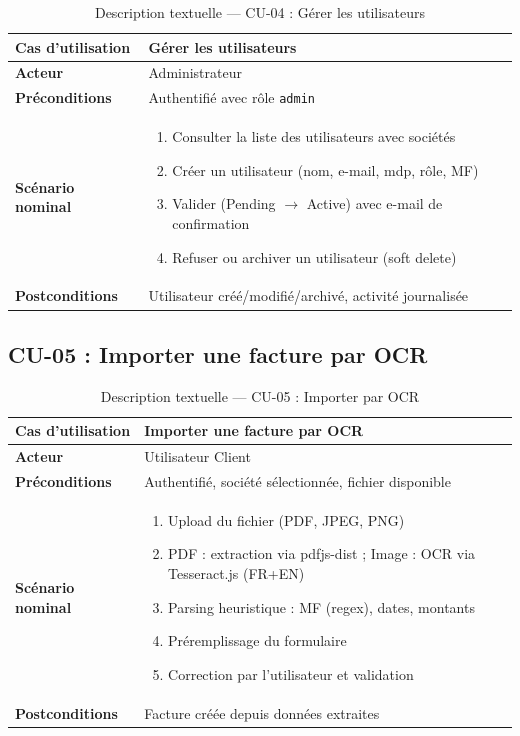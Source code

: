 \documentclass[a4paper,12pt]{report}
\begin{document}
\begin{table}[htbp]
\centering
\caption{Description textuelle — CU-04 : Gérer les utilisateurs}
\begin{tabularx}{\textwidth}{|l|X|}
\hline
\textbf{Cas d'utilisation} & Gérer les utilisateurs \\
\hline
\textbf{Acteur} & Administrateur \\
\hline
\textbf{Préconditions} & Authentifié avec rôle \texttt{admin} \\
\hline
\textbf{Scénario nominal} &
\begin{enumerate}[nosep, leftmargin=*]
    \item Consulter la liste des utilisateurs avec sociétés
    \item Créer un utilisateur (nom, e-mail, mdp, rôle, MF)
    \item Valider (Pending $\rightarrow$ Active) avec e-mail de confirmation
    \item Refuser ou archiver un utilisateur (soft delete)
\end{enumerate} \\
\hline
\textbf{Postconditions} & Utilisateur créé/modifié/archivé, activité journalisée \\
\hline
\end{tabularx}
\end{table}

\subsection{CU-05 : Importer une facture par OCR}

\begin{table}[htbp]
\centering
\caption{Description textuelle — CU-05 : Importer par OCR}
\begin{tabularx}{\textwidth}{|l|X|}
\hline
\textbf{Cas d'utilisation} & Importer une facture par OCR \\
\hline
\textbf{Acteur} & Utilisateur Client \\
\hline
\textbf{Préconditions} & Authentifié, société sélectionnée, fichier disponible \\
\hline
\textbf{Scénario nominal} &
\begin{enumerate}[nosep, leftmargin=*]
    \item Upload du fichier (PDF, JPEG, PNG)
    \item PDF : extraction via pdfjs-dist ; Image : OCR via Tesseract.js (FR+EN)
    \item Parsing heuristique : MF (regex), dates, montants
    \item Préremplissage du formulaire
    \item Correction par l'utilisateur et validation
\end{enumerate} \\
\hline
\textbf{Postconditions} & Facture créée depuis données extraites \\
\hline
\end{tabularx}
\end{table}
\end{document}
